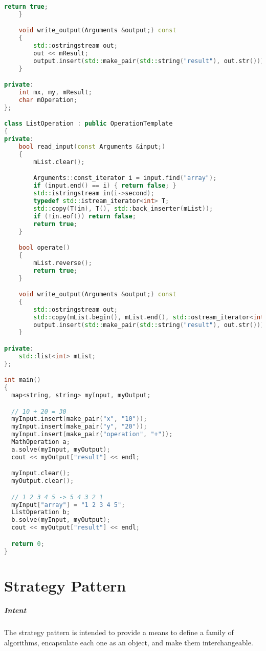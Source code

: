 \documentclass{book}
\begin{document}
\begin{lstlisting}[caption={Template Method Pattern Sample 2}, language=C++]
        return true;
    }

    void write_output(Arguments &output;) const
    {
        std::ostringstream out;
        out << mResult;
        output.insert(std::make_pair(std::string("result"), out.str()));
    }

private:
    int mx, my, mResult;
	char mOperation;
};

class ListOperation : public OperationTemplate
{
private:
    bool read_input(const Arguments &input;)
    {
        mList.clear();

        Arguments::const_iterator i = input.find("array");
        if (input.end() == i) { return false; }
        std::istringstream in(i->second);
        typedef std::istream_iterator<int> T;
        std::copy(T(in), T(), std::back_inserter(mList));
        if (!in.eof()) return false;
        return true;
    }

    bool operate()
    {
        mList.reverse();
        return true;
    }

    void write_output(Arguments &output;) const
    {
        std::ostringstream out;
        std::copy(mList.begin(), mList.end(), std::ostream_iterator<int>(out, " "));
        output.insert(std::make_pair(std::string("result"), out.str()));
    }

private:
    std::list<int> mList;
};

int main()
{
  map<string, string> myInput, myOutput;

  // 10 + 20 = 30
  myInput.insert(make_pair("x", "10"));
  myInput.insert(make_pair("y", "20"));
  myInput.insert(make_pair("operation", "+"));
  MathOperation a;
  a.solve(myInput, myOutput);
  cout << myOutput["result"] << endl;

  myInput.clear();
  myOutput.clear();

  // 1 2 3 4 5 -> 5 4 3 2 1
  myInput["array"] = "1 2 3 4 5";
  ListOperation b;
  b.solve(myInput, myOutput);
  cout << myOutput["result"] << endl;

  return 0;
}
\end{lstlisting}


\chapter{Strategy Pattern}\label{StrategyPattern}

\paragraph{Intent}
The strategy pattern is intended to provide a means to define a family of algorithms, encapsulate each one as an object, and make them interchangeable.
\end{document}
